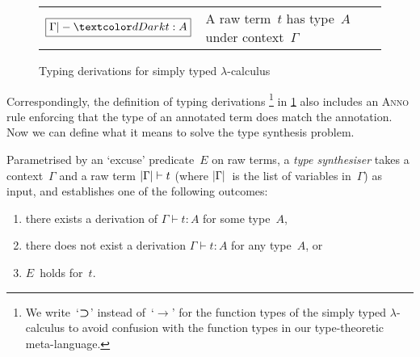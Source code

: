 \begin{figure}
  \small
  \bgroup
  \renewcommand{\arraystretch}{1.5}
  \begin{tabular}{ r l }
    $\boxed{\Gamma |- \isTerm{t} : A}$ & A raw term~$t$ has type~$A$ under context~$\Gamma$
  \end{tabular}
  \egroup
  \centering
  \caption{Typing derivations for simply typed $\lambda$-calculus}
  \label{fig:STLC-typing-derivations}
\end{figure}
Correspondingly, the definition of typing derivations%
\footnote{We write~`$\mathbin{\bm{\supset}}$' instead of~`$\to$' for the function types of the simply typed $\lambda$-calculus to avoid confusion with the function types in our type-theoretic meta-language.}
in \cref{fig:STLC-typing-derivations} also includes an \textsc{Anno} rule enforcing that the type of an annotated term does match the annotation.
Now we can define what it means to solve the type synthesis problem.

\begin{defn}
\label{def:STLC-type-synthesiser}
Parametrised by an `excuse' predicate~$E$ on raw terms, a \emph{type synthesiser} takes a context~$\Gamma$ and a raw term $\left|\Gamma\right| \vdash t$ (where $\left|\Gamma\right|$~is the list of variables in~$\Gamma$) as input, and establishes one of the following outcomes:
\begin{enumerate}
\item there exists a derivation of $\Gamma \vdash t : A$ for some type~$A$,
\item there does not exist a derivation $\Gamma \vdash t : A$ for any type~$A$, or
\item $E$~holds for~$t$.
\end{enumerate}
\end{defn}

